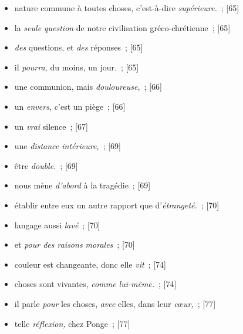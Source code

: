 \documentclass[12pt, a4paper]{article}
\begin{document}
\begin{itemize}
    \item nature commune à toutes choses, c’est-à-dire \textit{supérieure.}{\color{gray}~; [65]}

    \item la \textit{seule question }de notre civilisation gréco-chrétienne{\color{gray}~; [65]}

    \item \textit{des} questions, et \textit{des} réponses{\color{gray}~; [65]}

    \item il \textit{pourra,} du moins, un jour.{\color{gray}~; [65]}

    \item une communion, mais \textit{douloureuse,}{\color{gray}~; [66]}

    \item un \textit{envers,} c’est un piège{\color{gray}~; [66]}

    \item un \textit{vrai} silence{\color{gray}~; [67]}

    \item une \textit{distance intérieure,}{\color{gray}~; [69]}

    \item être \textit{double.}{\color{gray}~; [69]}

    \item nous mène \textit{d’abord} à la tragédie{\color{gray}~; [69]}

    \item établir entre eux un autre rapport que d’\textit{étrangeté.}{\color{gray}~; [70]}

    \item langage aussi \textit{lavé}{\color{gray}~; [70]}

    \item et \textit{pour des raisons morales}{\color{gray}~; [70]}

    \item couleur est changeante, donc elle \textit{vit}{\color{gray}~; [74]}

    \item choses sont vivantes, \textit{comme lui-même.}{\color{gray}~; [74]}

    \item il parle \textit{pour }les choses, \textit{avec} elles, dans leur \textit{cœur,}{\color{gray}~; [77]}

    \item telle \textit{réflexion,} chez Ponge{\color{gray}~; [77]}


\end{itemize}
\end{document}
